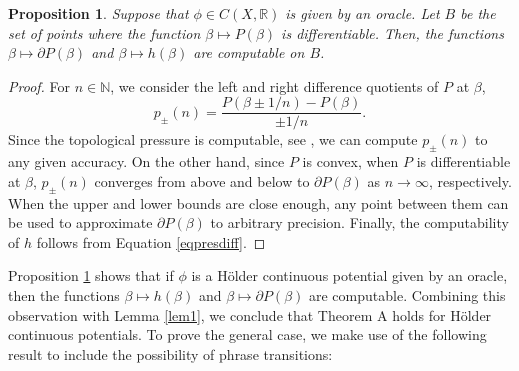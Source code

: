 \documentclass[11pt, reqno]{amsart}
\newtheorem{proposition}[theorem]{Proposition}
\newcommand{\bR}{{\mathbb R}}
\newcommand{\bN}{{\mathbb N}}
\begin{document}
\begin{proposition} \label{proholder}
Suppose that $\phi\in C(X,\bR)$ is given by an oracle.  Let $B$ be the set of points where the function $\beta\mapsto P(\beta)$ is differentiable.  Then, the functions $\beta\mapsto\partial P(\beta)$ and $\beta\mapsto h(\beta)$ are computable on $B$.
\end{proposition}
\begin{proof}
For $n\in\bN$, we consider the left and right difference quotients of $P$ at $\beta$,
$$
p_\pm(n)=\frac{P(\beta\pm 1/n)-P(\beta)}{\pm 1/n}.
$$
Since the topological pressure is computable, see \cite{BSW, Sp}, we can compute  $p_\pm(n)$  to any given accuracy.
On the other hand, since $P$ is convex, when $P$ is differentiable at $\beta$, $p_\pm(n)$ converges from above and below to $\partial P(\beta)$ as $n\to\infty$, respectively.  When the upper and lower bounds are close enough, any point between them can be used to approximate $\partial P(\beta)$ to arbitrary precision.  Finally, the computability of $h$ follows from Equation \eqref{eqpresdiff}.
\end{proof}
Proposition \ref{proholder} shows that if $\phi$ is a H\"older continuous potential given by an oracle, then the functions $\beta\mapsto h(\beta)$ and $\beta\mapsto \partial P(\beta)$ are computable. Combining this observation with Lemma \ref{lem1}, we conclude that Theorem A holds for H\"older continuous potentials. To prove the general case, 
we make use of the following result to include the possibility of phrase transitions:
\end{document}
